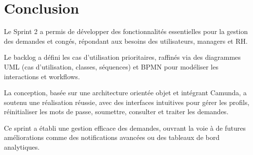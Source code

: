 \section{Conclusion}
Le Sprint 2 a permis de développer des fonctionnalités essentielles pour la gestion des demandes et congés, répondant aux besoins des utilisateurs, managers et RH.

Le backlog a défini les cas d’utilisation prioritaires, raffinés via des diagrammes UML (cas d’utilisation, classes, séquences) et BPMN pour modéliser les interactions et workflows.

La conception, basée sur une architecture orientée objet et intégrant Camunda, a soutenu une réalisation réussie, avec des interfaces intuitives pour gérer les profils, réinitialiser les mots de passe, soumettre, consulter et traiter les demandes.

Ce sprint a établi une gestion efficace des demandes, ouvrant la voie à de futures améliorations comme des notifications avancées ou des tableaux de bord analytiques.